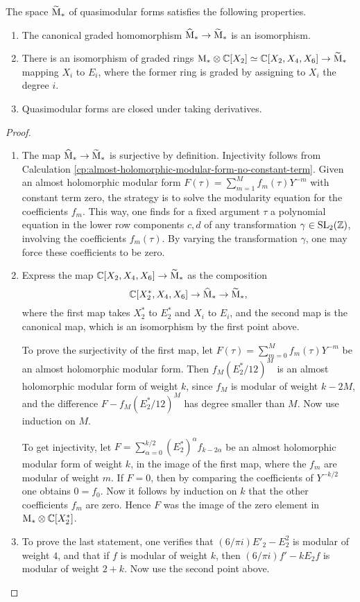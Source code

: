 \begin{prop} The space $\widetilde{\mathrm{M}}_*$ of quasimodular forms satisfies the following properties.
 \begin{enumerate}
  \item The canonical graded homomorphism $\widehat{\mathrm{M}}_* \to \widetilde{\mathrm{M}}_*$ is an isomorphism.
  \item There is an isomorphism of graded rings $\mathrm{M}_* \otimes \mathbb{C}[X_2] \simeq \mathbb{C}[X_2, X_4, X_6]\to \widetilde{\mathrm{M}}_*$ mapping $X_i$ to $E_i$, where the former ring is graded by assigning to $X_i$ the degree $i$.
  \item Quasimodular forms are closed under taking derivatives.
 \end{enumerate}
\end{prop}
\begin{proof}
 \begin{enumerate}
  \item The map $\widehat{\mathrm{M}}_* \to \widetilde{\mathrm{M}}_*$ is surjective by definition. Injectivity follows from Calculation \ref{cp:almost-holomorphic-modular-form-no-constant-term}. Given an almost holomorphic modular form $F(\tau)=\sum_{m=1}^Mf_m(\tau)Y^{-m}$ with constant term zero, the strategy is to solve the modularity equation for the coefficients $f_m$. This way, one finds for a fixed argument $\tau$ a polynomial equation in the lower row components  $c,d$ of any transformation $\gamma \in \operatorname{SL}_2(\mathbb{Z})$, involving the coefficients $f_m(\tau)$. By varying the transformation $\gamma$, one may force these coefficients to be zero.
  \item Express the map $\mathbb{C}[X_2, X_4, X_6]\to \widetilde{\mathrm{M}}_*$ as the composition \[\mathbb{C}[X^*_2, X_4, X_6]\to \widehat{\mathrm{M}}_* \to \widetilde{\mathrm{M}}_*,\] where the first map takes $X^*_2$ to $E_2^*$ and $X_i$ to $E_i$, and the second map is the canonical map, which is an isomorphism by the first point above.
  
  To prove the surjectivity of the first map, let $F(\tau)=\sum_{m=0}^Mf_m(\tau)Y^{-m}$ be an almost holomorphic modular form. Then $f_M (E_2^*/12)^M$ is an almost holomorphic modular form of weight $k$, since $f_M$ is modular of weight $k-2M$, and the difference $F - f_M (E_2^*/12)^M$ has degree smaller than $M$. Now use induction on $M$.
  
  To get injectivity, let $F=\sum_{\alpha=0}^{k/2}(E_2^*)^\alpha f_{k-2\alpha}$ be an almost holomorphic modular form of weight $k$, in the image of the first map, where the $f_m$ are modular of weight $m$. If $F=0$, then by comparing the coefficients of $Y^{-k/2}$ one obtains $0=f_0$. Now it follows by induction on $k$ that the other coefficients $f_m$ are zero. Hence $F$ was the image of the zero element in $\mathrm{M}_* \otimes \mathbb{C}[X^*_2]$.
  \item To prove the last statement, one verifies that $(6/\pi i) E'_2-E_2^2$ is modular of weight $4$, and that if $f$ is modular of weight $k$, then $(6/\pi i)f' - kE_2f$ is modular of weight $2+k$. Now use the second point above.
 \end{enumerate}

\end{proof}


